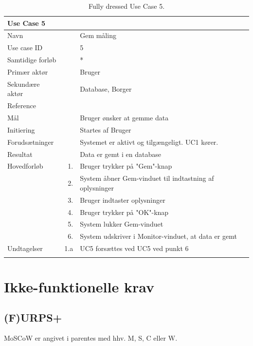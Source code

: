 \begin{longtabu} to  %
    {\large \textbf{Use Case 5}} && \\
    \toprule
    Navn &&    Gem måling\\
    Use case ID &&    5\\
    Samtidige forløb &&   *\\
    Primær aktør &&    Bruger\\
    Sekundære aktør &&	Database, Borger \\
    Reference &&      \\
    Mål &&    Bruger ønsker at gemme data\\
    Initiering &&	Startes af Bruger\\
    Forudsætninger &&  Systemet er aktivt og tilgængeligt. UC1 kører.  \\
    Resultat &&		Data er gemt i en database                 \\ \midrule
    Hovedforløb &    1. &    Bruger trykker på "Gem"\--knap \\	
                &    2. &    System åbner Gem-vinduet til indtastning af oplysninger\\[-1ex]
                &    3.	&	 Bruger indtaster oplysninger\\[-1ex]
                &	 4. &    Bruger trykker på "OK"\--knap  \\[-1ex]
                &	 5.	&	 System lukker Gem-vinduet\\[-1ex]
                &	 6.	&	 System udskriver i Monitor-vinduet, at data er gemt\newline
                
                \\ \midrule
                
    Undtagelser &   1.a  &  UC5 forsættes ved UC5 ved punkt 6    \\ \bottomrule
\caption{Fully dressed Use Case 5.}
\label{UC5}
\end{longtabu}


\section{Ikke-funktionelle krav}


\subsection{(F)URPS+}
MoSCoW er angivet i parentes med hhv. M, S, C eller W.

